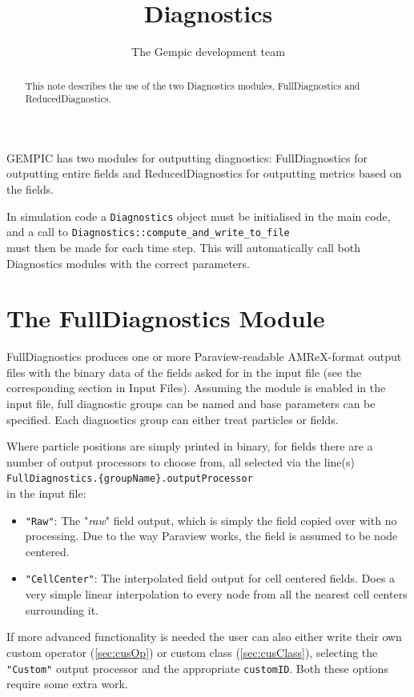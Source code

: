 \documentclass[11pt]{article}
\title{Diagnostics}
\author[1]{The Gempic development team}
\affil[1]{Max-Planck-Institut f\"ur Plasmaphysik, Garching, Germany}
\begin{document}
\maketitle

\begin{abstract}
This note describes the use of the two Diagnostics modules, FullDiagnostics and ReducedDiagnostics.
\end{abstract}

\tableofcontents
%
GEMPIC has two modules for outputting diagnostics: FullDiagnostics for outputting entire fields and ReducedDiagnostics for outputting metrics based on the fields.

In simulation code a \lstinline|Diagnostics| object must be initialised in the main code, and a call to
\lstinline|Diagnostics::compute_and_write_to_file|\\
must then be made for each time step. This will automatically call both Diagnostics modules with the correct parameters.

\section{The FullDiagnostics Module}
FullDiagnostics produces one or more Paraview-readable AMReX-format output files with the binary data of the fields asked for in the input file (see the corresponding section in Input Files).
Assuming the module is enabled in the input file, full diagnostic groups can be named and base parameters can be specified. Each diagnostics group can either treat particles or fields.

Where particle positions are simply printed in binary, for fields there are a number of output processors to choose from, all selected via the line(s)
\\\lstinline|FullDiagnostics.{groupName}.outputProcessor|\\
in the input file:

\begin{itemize}
    \item \texttt{"Raw"}: The "\emph{raw}" field output, which is simply the field copied over with no processing. Due to the way Paraview works, the field is assumed to be node centered.
    \item \texttt{"CellCenter"}: The interpolated field output for cell centered fields. Does a very simple linear interpolation to every node from all the nearest cell centers surrounding it.
\end{itemize}
If more advanced functionality is needed the user can also either write their own custom operator (\ref{sec:cusOp}) or custom class (\ref{sec:cusClass}), selecting the \verb|"Custom"| output processor and the appropriate \verb|customID|.
Both these options require some extra work.
\end{document}
